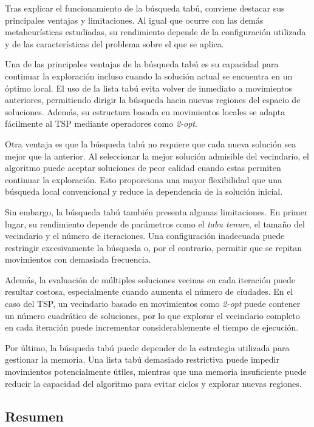 Tras explicar el funcionamiento de la búsqueda tabú, conviene destacar sus principales ventajas y limitaciones. Al igual
que ocurre con las demás metaheurísticas estudiadas, su rendimiento depende de la configuración utilizada y de las
características del problema sobre el que se aplica.

Una de las principales ventajas de la búsqueda tabú es su capacidad para continuar la exploración incluso cuando la solución
actual se encuentra en un óptimo local. El uso de la lista tabú evita volver de inmediato a movimientos anteriores, permitiendo
dirigir la búsqueda hacia nuevas regiones del espacio de soluciones. Además, su estructura basada en movimientos locales
se adapta fácilmente al TSP mediante operadores como \textit{2-opt}.

Otra ventaja es que la búsqueda tabú no requiere que cada nueva solución sea mejor que la anterior. Al seleccionar la mejor
solución admisible del vecindario, el algoritmo puede aceptar soluciones de peor calidad cuando estas permiten continuar
la exploración. Esto proporciona una mayor flexibilidad que una búsqueda local convencional y reduce la dependencia de la
solución inicial.

Sin embargo, la búsqueda tabú también presenta algunas limitaciones. En primer lugar, su rendimiento depende de parámetros
como el \textit{tabu tenure}, el tamaño del vecindario y el número de iteraciones. Una configuración inadecuada puede
restringir excesivamente la búsqueda o, por el contrario, permitir que se repitan movimientos con demasiada frecuencia.

Además, la evaluación de múltiples soluciones vecinas en cada iteración puede resultar costosa, especialmente cuando aumenta
el número de ciudades. En el caso del TSP, un vecindario basado en movimientos como \textit{2-opt} puede contener un número
cuadrático de soluciones, por lo que explorar el vecindario completo en cada iteración puede incrementar considerablemente
el tiempo de ejecución.

Por último, la búsqueda tabú puede depender de la estrategia utilizada para gestionar la memoria. Una lista tabú demasiado
restrictiva puede impedir movimientos potencialmente útiles, mientras que una memoria insuficiente puede reducir la capacidad
del algoritmo para evitar ciclos y explorar nuevas regiones.

\subsection{Resumen}
\label{subsec:ts_summary}

